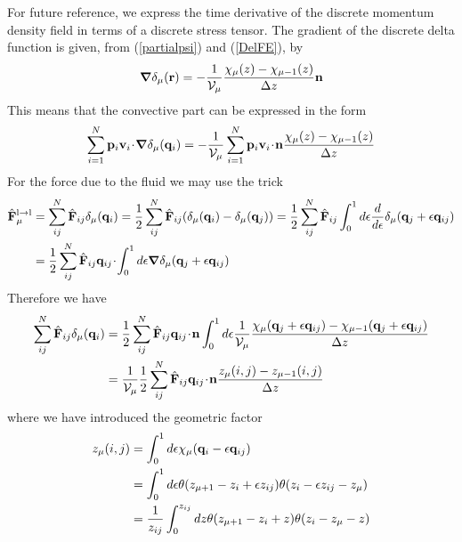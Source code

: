 \documentclass[b5paper,openright,10pt]{book}
\newcommand{\esc}{\!\cdot\!}
\begin{document}
For future reference,  we express the time derivative  of the discrete
momentum density field  in terms of a discrete stress  tensor. 
The  gradient   of  the  discrete   delta  function  is   given,  from
(\ref{partialpsi}) and (\ref{DelFE}), by
\begin{align}
  \boldsymbol{\nabla}\delta_\mu({\bf r})=-\frac{1}{{\cal V}_\mu}\frac{\chi_\mu(z)-\chi_{\mu-1}(z)}{\Delta z} {\bf n}
\end{align}
This means that the convective part can be expressed in the form
\begin{align}
  \sum_{i=1}^N{\bf p}_i{\bf v}_i\esc\boldsymbol{\nabla}\delta_\mu({\bf q}_i)&=
-\frac{1}{{\cal V}_\mu} \sum_{i=1}^N{\bf p}_i{\bf v}_i\esc{\bf n}\frac{\chi_\mu(z)-\chi_{\mu-1}(z)}{\Delta z}
\nonumber\\ 
\end{align}
For the force due to the fluid we may use the trick
\begin{align}
  \hat{{\bf F}}_\mu^{\rm l\to l}&=  \sum_{ij}^N\hat{\bf F}_{ij}\delta_\mu({\bf q}_i)
=\frac{1}{2}\sum_{ij}^N\hat{\bf F}_{ij}
(\delta_\mu({\bf q}_i)-\delta_\mu({\bf q}_j))
=\frac{1}{2}\sum_{ij}^N\hat{\bf F}_{ij}\int_0^1d\epsilon \frac{d}{d\epsilon}
\delta_\mu({\bf q}_j+\epsilon{\bf q}_{ij})
\nonumber\\
&=\frac{1}{2}\sum_{ij}^N\hat{\bf F}_{ij}{\bf q}_{ij}\esc\int_0^1d\epsilon 
\boldsymbol{\nabla}\delta_\mu({\bf q}_j+\epsilon{\bf q}_{ij})
\end{align}
Therefore we have
\begin{align}
   \sum_{ij}^N\hat{\bf F}_{ij}\delta_\mu({\bf q}_i)
   &=\frac{1}{2}\sum_{ij}^N\hat{\bf F}_{ij}{\bf q}_{ij}\esc{\bf n}
\int_0^1d\epsilon 
\frac{1}{{\cal V}_\mu}\frac{\chi_\mu({\bf q}_j+\epsilon{\bf q}_{ij})-\chi_{\mu-1}({\bf q}_j+\epsilon{\bf q}_{ij})}{\Delta z} 
\nonumber\\
& 
=\frac{1}{{\cal V}_\mu}\frac{1}{2}\sum_{ij}^N\hat{\bf F}_{ij}{\bf q}_{ij}\esc{\bf n}
\frac{z_\mu(i,j)-z_{\mu-1}(i,j)}{\Delta z} 
\label{Fvir}
\end{align}
where we have introduced the geometric factor 
\begin{align}
z_\mu(i,j)&=  \int_0^{1}d\epsilon\chi_\mu({\bf q}_i-\epsilon{\bf q}_{ij})
\nonumber\\
&=  \int_0^{1}d\epsilon
\theta(z_{\mu+1}-z_i+\epsilon z_{ij})\theta(z_i-\epsilon z_{ij}-z_\mu)
\nonumber\\
&= \frac{1}{z_{ij}} \int_0^{z_{ij}}dz
\theta(z_{\mu+1}-z_i+z)\theta(z_i-z_\mu-z)
\label{int}
\end{align}
\end{document}
